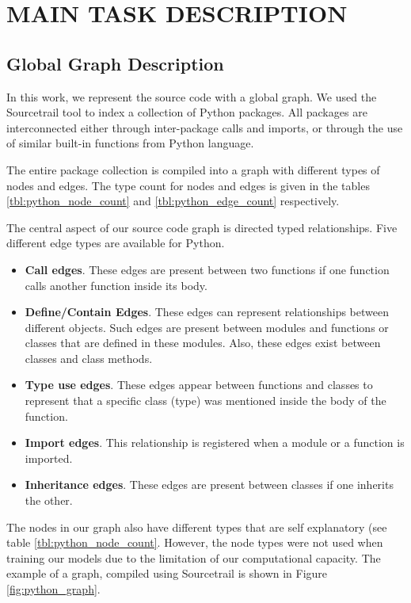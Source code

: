 \documentclass[a4paper,twoside]{article}
\begin{document}
\section{\uppercase{Main Task Description}}

\subsection{Global Graph Description}

In this work, we represent the source code with a global graph. We used the Sourcetrail tool to index a collection of Python packages. All packages are interconnected either through inter-package calls and imports, or through the use of similar built-in functions from Python language. 

The entire package collection is compiled into a graph with different types of nodes and edges. The type count for nodes and edges is given in the tables \ref{tbl:python_node_count} and \ref{tbl:python_edge_count} respectively.

The central aspect of our source code graph is directed typed relationships. Five different edge types are available for Python.

\begin{itemize}
    \item \textbf{Call edges}. These edges are present between two functions if one function calls another function inside its body.
    \item \textbf{Define/Contain Edges}. These edges can represent relationships between different objects. Such edges are present between modules and functions or classes that are defined in these modules. Also, these edges exist between classes and class methods.
    \item \textbf{Type use edges}. These edges appear between functions and classes to represent that a specific class (type) was mentioned inside the body of the function.
    \item \textbf{Import edges}. This relationship is registered when a module or a function is imported.
    \item \textbf{Inheritance edges}. These edges are present between classes if one inherits the other. 
\end{itemize}

The nodes in our graph also have different types that are self explanatory (see table \ref{tbl:python_node_count}. However, the node types were not used when training our models due to the limitation of our computational capacity. The example of a graph, compiled using Sourcetrail is shown in Figure \ref{fig:python_graph}.
\end{document}
